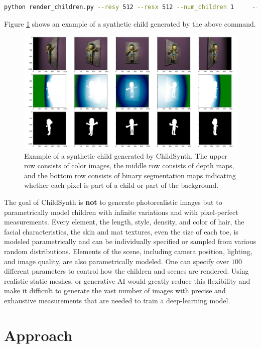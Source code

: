 \documentclass{article}
\begin{document}
\begin{lstlisting}[language=bash]
python render_children.py --resy 512 --resx 512 --num_children 1     --output_dir ./output 
\end{lstlisting}

Figure \ref{fig:child_0} shows an example of a synthetic child generated by the above command.

\begin{figure}[]
    \centering
    \includegraphics[width=\textwidth]{plots/child_0.png}
    \caption{Example of a synthetic child generated by ChildSynth. The upper row consists of color images, the middle row consists of depth maps, and the bottom row consists of binary segmentation maps indicating whether each pixel is part of a child or part of the background.}
    \label{fig:child_0}
\end{figure}

The goal of ChildSynth is \textbf{not} to generate photorealistic images but to parametrically model children with infinite variations and with pixel-perfect measurements. Every element, the length, style, density, and color of hair, the facial characteristics, the skin and mat textures, even the size of each toe, is modeled parametrically and can be individually specified or sampled from various random distributions. Elements of the scene, including camera position, lighting, and image quality, are also parametrically modeled. One can specify over $100$ different parameters to control how the children and scenes are rendered. Using realistic static meshes, or generative AI would greatly reduce this flexibility and make it difficult to generate the vast number of images with precise and exhaustive measurements that are needed to train a deep-learning model.

\section{Approach}
\end{document}
